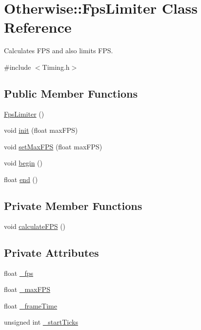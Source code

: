 \hypertarget{class_otherwise_1_1_fps_limiter}{}\section{Otherwise\+:\+:Fps\+Limiter Class Reference}
\label{class_otherwise_1_1_fps_limiter}


Calculates F\+PS and also limits F\+PS.  




{\ttfamily \#include $<$Timing.\+h$>$}

\subsection*{Public Member Functions}
\begin{DoxyCompactItemize}
\item 
\hyperlink{class_otherwise_1_1_fps_limiter_a33e5f47acb0231681e68debf50baeb82}{Fps\+Limiter} ()
\item 
void \hyperlink{class_otherwise_1_1_fps_limiter_ae66d95d3064d999c843c24197da9fa45}{init} (float max\+F\+PS)
\item 
void \hyperlink{class_otherwise_1_1_fps_limiter_a561d97447c641547e59b15487e5c70f2}{set\+Max\+F\+PS} (float max\+F\+PS)
\item 
void \hyperlink{class_otherwise_1_1_fps_limiter_a0c608b963c939c8dc866488d4ba1edfd}{begin} ()
\item 
float \hyperlink{class_otherwise_1_1_fps_limiter_acde3d9d1cccba1aaa3797eb212aec44e}{end} ()
\end{DoxyCompactItemize}
\subsection*{Private Member Functions}
\begin{DoxyCompactItemize}
\item 
void \hyperlink{class_otherwise_1_1_fps_limiter_ae82062ce3e0b7558eb2dc3ca643b0fbe}{calculate\+F\+PS} ()
\end{DoxyCompactItemize}
\subsection*{Private Attributes}
\begin{DoxyCompactItemize}
\item 
float \hyperlink{class_otherwise_1_1_fps_limiter_a8e76b63aaeb1547ef875879bc80fe1fe}{\+\_\+fps}
\item 
float \hyperlink{class_otherwise_1_1_fps_limiter_a2ce59cedc6b8b28e32c1efe908e95548}{\+\_\+max\+F\+PS}
\item 
float \hyperlink{class_otherwise_1_1_fps_limiter_a169412fddc4300a01480e8a6626f4c21}{\+\_\+frame\+Time}
\item 
unsigned int \hyperlink{class_otherwise_1_1_fps_limiter_a58b6d9e0f2a36ee4c53e54d4c9ec199d}{\+\_\+start\+Ticks}
\end{DoxyCompactItemize}


